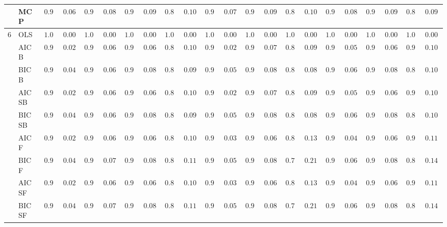 \begin{tabular}{ll|ll|llllll|llllll|llllll}
 & MCP  & $0.972$ & $0.0697$ & $0.956$ & $0.0833$ & $0.926$ & $0.0970$ & $0.866$ & $0.1066$ & $0.968$ & $0.0737$ & $0.922$ & $0.0980$ & $0.836$ & $0.1040$ & $0.958$ & $0.0819$ & $0.918$ & $0.0989$ & $0.856$ & $0.0988$ \\\hline
6 & OLS  & $1.000$ & $0.0000$ & $1.000$ & $0.0000$ & $1.000$ & $0.0000$ & $1.000$ & $0.0000$ & $1.000$ & $0.0000$ & $1.000$ & $0.0000$ & $1.000$ & $0.0000$ & $1.000$ & $0.0000$ & $1.000$ & $0.0000$ & $1.000$ & $0.0000$ \\
 & AIC B  & $0.998$ & $0.0200$ & $0.980$ & $0.0603$ & $0.978$ & $0.0629$ & $0.898$ & $0.1005$ & $0.996$ & $0.0281$ & $0.970$ & $0.0718$ & $0.866$ & $0.0945$ & $0.986$ & $0.0513$ & $0.978$ & $0.0629$ & $0.910$ & $0.1040$ \\
 & BIC B  & $0.990$ & $0.0438$ & $0.972$ & $0.0697$ & $0.960$ & $0.0804$ & $0.860$ & $0.0921$ & $0.986$ & $0.0513$ & $0.948$ & $0.0882$ & $0.842$ & $0.0867$ & $0.978$ & $0.0629$ & $0.952$ & $0.0858$ & $0.872$ & $0.1006$ \\
 & AIC SB  & $0.998$ & $0.0200$ & $0.980$ & $0.0603$ & $0.978$ & $0.0629$ & $0.898$ & $0.1005$ & $0.996$ & $0.0281$ & $0.970$ & $0.0718$ & $0.868$ & $0.0952$ & $0.986$ & $0.0513$ & $0.978$ & $0.0629$ & $0.910$ & $0.1040$ \\
 & BIC SB  & $0.990$ & $0.0438$ & $0.972$ & $0.0697$ & $0.960$ & $0.0804$ & $0.860$ & $0.0921$ & $0.986$ & $0.0513$ & $0.950$ & $0.0870$ & $0.842$ & $0.0867$ & $0.978$ & $0.0629$ & $0.952$ & $0.0858$ & $0.872$ & $0.1006$ \\
 & AIC F  & $0.998$ & $0.0200$ & $0.980$ & $0.0603$ & $0.978$ & $0.0629$ & $0.898$ & $0.1005$ & $0.994$ & $0.0343$ & $0.972$ & $0.0697$ & $0.858$ & $0.1342$ & $0.988$ & $0.0477$ & $0.974$ & $0.0676$ & $0.902$ & $0.1155$ \\
 & BIC F  & $0.990$ & $0.0438$ & $0.970$ & $0.0718$ & $0.958$ & $0.0819$ & $0.832$ & $0.1162$ & $0.982$ & $0.0575$ & $0.948$ & $0.0882$ & $0.718$ & $0.2148$ & $0.978$ & $0.0629$ & $0.948$ & $0.0882$ & $0.840$ & $0.1477$ \\
 & AIC SF  & $0.998$ & $0.0200$ & $0.980$ & $0.0603$ & $0.978$ & $0.0629$ & $0.898$ & $0.1005$ & $0.994$ & $0.0343$ & $0.972$ & $0.0697$ & $0.854$ & $0.1329$ & $0.988$ & $0.0477$ & $0.972$ & $0.0697$ & $0.902$ & $0.1155$ \\
 & BIC SF  & $0.990$ & $0.0438$ & $0.970$ & $0.0718$ & $0.958$ & $0.0819$ & $0.832$ & $0.1162$ & $0.982$ & $0.0575$ & $0.948$ & $0.0882$ & $0.718$ & $0.2148$ & $0.978$ & $0.0629$ & $0.948$ & $0.0882$ & $0.840$ & $0.1477$ \\

\end{tabular}
